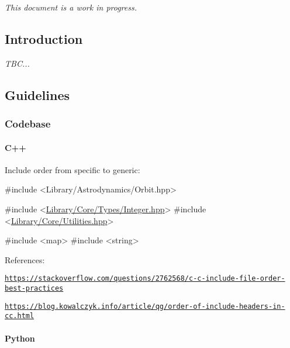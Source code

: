 {\itshape This document is a work in progress.}

\subsection*{Introduction}

{\itshape T\+BC...}

\subsection*{Guidelines}

\subsubsection*{Codebase}

\paragraph*{C++}

Include order from specific to generic\+:


\begin{DoxyCode}
\textcolor{preprocessor}{#include <Library/Astrodynamics/Orbit.hpp>}

\textcolor{preprocessor}{#include <\hyperlink{_integer_8hpp}{Library/Core/Types/Integer.hpp}>}
\textcolor{preprocessor}{#include <\hyperlink{_utilities_8hpp}{Library/Core/Utilities.hpp}>}

\textcolor{preprocessor}{#include <map>}
\textcolor{preprocessor}{#include <string>}
\end{DoxyCode}


References\+:


\begin{DoxyItemize}
\item \href{https://stackoverflow.com/questions/2762568/c-c-include-file-order-best-practices}{\tt https\+://stackoverflow.\+com/questions/2762568/c-\/c-\/include-\/file-\/order-\/best-\/practices}
\item \href{https://blog.kowalczyk.info/article/qg/order-of-include-headers-in-cc.html}{\tt https\+://blog.\+kowalczyk.\+info/article/qg/order-\/of-\/include-\/headers-\/in-\/cc.\+html}
\end{DoxyItemize}

\paragraph*{Python}

